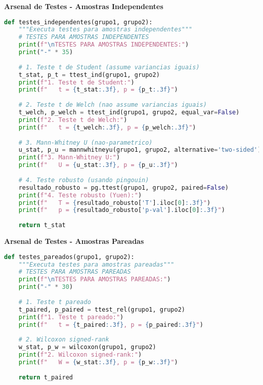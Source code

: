 \begin{examplebox}
\textbf{Arsenal de Testes - Amostras Independentes}

\begin{lstlisting}[language=Python]
def testes_independentes(grupo1, grupo2):
    """Executa testes para amostras independentes"""
    # TESTES PARA AMOSTRAS INDEPENDENTES
    print(f"\nTESTES PARA AMOSTRAS INDEPENDENTES:")
    print("-" * 35)
    
    # 1. Teste t de Student (assume variancias iguais)
    t_stat, p_t = ttest_ind(grupo1, grupo2)
    print(f"1. Teste t de Student:")
    print(f"   t = {t_stat:.3f}, p = {p_t:.3f}")
    
    # 2. Teste t de Welch (nao assume variancias iguais)
    t_welch, p_welch = ttest_ind(grupo1, grupo2, equal_var=False)
    print(f"2. Teste t de Welch:")
    print(f"   t = {t_welch:.3f}, p = {p_welch:.3f}")
    
    # 3. Mann-Whitney U (nao-parametrico)
    u_stat, p_u = mannwhitneyu(grupo1, grupo2, alternative='two-sided')
    print(f"3. Mann-Whitney U:")
    print(f"   U = {u_stat:.3f}, p = {p_u:.3f}")
    
    # 4. Teste robusto (usando pingouin)
    resultado_robusto = pg.ttest(grupo1, grupo2, paired=False)
    print(f"4. Teste robusto (Yuen):")
    print(f"   T = {resultado_robusto['T'].iloc[0]:.3f}")
    print(f"   p = {resultado_robusto['p-val'].iloc[0]:.3f}")
    
    return t_stat
\end{lstlisting}
\end{examplebox}

\begin{examplebox}
\textbf{Arsenal de Testes - Amostras Pareadas}

\begin{lstlisting}[language=Python]
def testes_pareados(grupo1, grupo2):
    """Executa testes para amostras pareadas"""
    # TESTES PARA AMOSTRAS PAREADAS
    print(f"\nTESTES PARA AMOSTRAS PAREADAS:")
    print("-" * 30)
    
    # 1. Teste t pareado
    t_paired, p_paired = ttest_rel(grupo1, grupo2)
    print(f"1. Teste t pareado:")
    print(f"   t = {t_paired:.3f}, p = {p_paired:.3f}")
    
    # 2. Wilcoxon signed-rank
    w_stat, p_w = wilcoxon(grupo1, grupo2)
    print(f"2. Wilcoxon signed-rank:")
    print(f"   W = {w_stat:.3f}, p = {p_w:.3f}")
    
    return t_paired
\end{lstlisting}
\end{examplebox}


